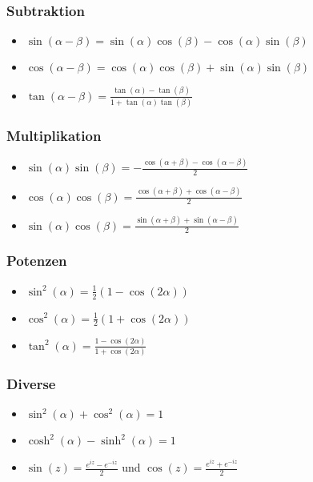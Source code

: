 \documentclass[a4paper,10pt]{article}
\begin{document}
\subsubsection{Subtraktion}
\begin{itemize}
 \item $\sin(\alpha - \beta) = \sin(\alpha) \cos(\beta) - \cos(\alpha)\sin(\beta)$
 \item $\cos(\alpha - \beta) = \cos(\alpha) \cos(\beta) + \sin(\alpha)\sin(\beta)$
 \item $\tan(\alpha - \beta) = \frac{\tan(\alpha) - \tan(\beta)}{1+\tan(\alpha) \tan(\beta)}$
\end{itemize}

\subsubsection{Multiplikation}
\begin{itemize}
 \item $\sin(\alpha) \sin(\beta) = -\frac{\cos(\alpha + \beta) - \cos(\alpha - \beta)}{2}$
 \item $\cos(\alpha) \cos(\beta) =  \frac{\cos(\alpha + \beta) + \cos(\alpha - \beta)}{2}$
 \item $\sin(\alpha) \cos(\beta) =  \frac{\sin(\alpha + \beta) + \sin(\alpha - \beta)}{2}$
\end{itemize}

\subsubsection{Potenzen}
\begin{itemize}
 \item $\sin^2(\alpha) = \frac{1}{2}(1-\cos(2\alpha))$
 \item $\cos^2(\alpha) = \frac{1}{2}(1+\cos(2\alpha))$
 \item $\tan^2(\alpha) = \frac{1-\cos(2\alpha)}{1+\cos(2\alpha)}$
\end{itemize}

\subsubsection{Diverse}

\begin{itemize}
 \item $\sin^2(\alpha) + \cos^2(\alpha) = 1$
 \item $\cosh^2(\alpha) - \sinh^2(\alpha) = 1$
 \item $\sin(z) = \frac{e^{iz} - e^{-iz}}{2}$ und $\cos(z) = \frac{e^{iz} + e^{-iz}}{2}$
\end{itemize}
\end{document}
